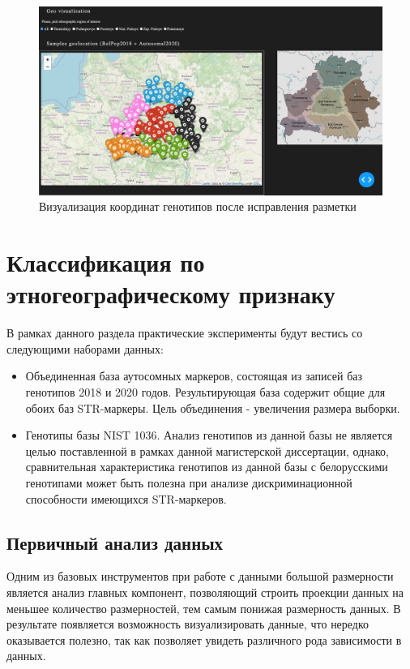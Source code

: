 \begin{figure}[h]
\begin{center}
\includegraphics[width=14cm]{images/geomap_v2.png}
\end{center}
  \caption{Визуализация координат генотипов после исправления разметки}
  \label{image:geomapv2}
\end{figure}

\section{Классификация по этногеографическому признаку}

В рамках данного раздела практические эксперименты будут вестись со следующими наборами данных:
\begin{itemize}
\item Объединенная база аутосомных маркеров, состоящая из записей баз генотипов 2018 и 2020 годов.
Результирующая база содержит общие для обоих баз STR-маркеры. Цель объединения - увеличения размера
выборки.

\item Генотипы базы NIST 1036. Анализ генотипов из данной базы не является целью
поставленной в рамках данной магистерской диссертации, однако, сравнительная характеристика
генотипов из данной базы с белорусскими генотипами может быть полезна при анализе дискриминационной
способности имеющихся STR-маркеров.
\end{itemize}

\subsection{Первичный анализ данных}
Одним из базовых инструментов при работе с данными большой размерности является
анализ главных компонент, позволяющий строить проекции данных на меньшее количество размерностей,
тем самым понижая размерность данных. В результате появляется возможность визуализировать данные,
что нередко оказывается полезно, так как позволяет увидеть различного рода зависимости в данных.


